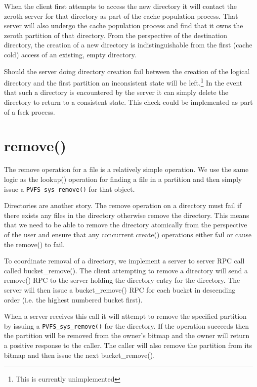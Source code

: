 \documentclass[letterpaper]{article}
\newcommand{\code}[1]{\texttt{#1}}
\begin{document}
When the client first attempts to access the new directory it will contact the
zeroth server for that directory as part of the cache population process.  That
server will also undergo the cache population process and find that it owns the
zeroth partition of that directory.  From the perspective of the destination
directory, the creation of a new directory is indistinguishable from the first
(cache cold) access of an existing, empty directory.

Should the server doing directory creation fail between the creation of the
logical directory and the first partition an inconsistent state will be
left.\footnote{This is currently unimplemented}  In the event that such a
directory is encountered by the server it can simply delete the directory to
return to a consistent state.  This check could be implemented as part of a
fsck process.

\section{remove()}
The remove operation for a file is a relatively simple operation.  We use the
same logic as the lookup() operation for finding a file in a partition and then
simply issue a \code{PVFS\_\-sys\_\-remove()} for that object.

Directories are another story.  The remove operation on a directory must fail if
there exists any files in the directory otherwise remove the directory.  This
means that we need to be able to remove the directory atomically from the
perspective of the user and ensure that any concurrent create() operations
either fail or cause the remove() to fail.

To coordinate removal of a directory, we implement a server to server RPC call
called bucket\_\-remove().  The client attempting to remove a directory will send a
remove() RPC to the server holding the directory entry for the directory.  The
server will then issue a bucket\_\-remove() RPC for each bucket in descending order
(i.e. the highest numbered bucket first).  

When a server receives this call it will attempt to remove the specified
partition by issuing a \code{PVFS\_\-sys\_\-remove()} for the directory.  If the operation
succeeds then the partition will be removed from the owner's bitmap and the
owner will return a positive response to the caller.  The caller will also
remove the partition from its bitmap and then issue the next bucket\_\-remove().
\end{document}
